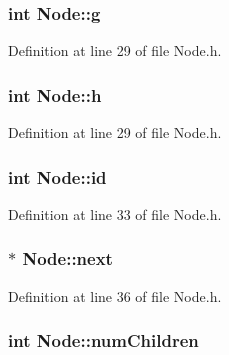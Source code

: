 \hypertarget{class_node_a0b249888eacdec6c623ec8c58b230c48}{
\subsubsection[{g}]{\setlength{\rightskip}{0pt plus 5cm}int {\bf Node::g}}}
\label{class_node_a0b249888eacdec6c623ec8c58b230c48}


Definition at line 29 of file Node.h.

\hypertarget{class_node_afb5a7ac7536a9e09488bb685420cd78a}{
\subsubsection[{h}]{\setlength{\rightskip}{0pt plus 5cm}int {\bf Node::h}}}
\label{class_node_afb5a7ac7536a9e09488bb685420cd78a}


Definition at line 29 of file Node.h.

\hypertarget{class_node_a59a543130a10c95f1e8642cf8c5645e8}{
\subsubsection[{id}]{\setlength{\rightskip}{0pt plus 5cm}int {\bf Node::id}}}
\label{class_node_a59a543130a10c95f1e8642cf8c5645e8}


Definition at line 33 of file Node.h.

\hypertarget{class_node_a2559a716f69ccaa76d648d9f1b83065e}{
\subsubsection[{next}]{$\ast$ {\bf Node::next}}}
\label{class_node_a2559a716f69ccaa76d648d9f1b83065e}


Definition at line 36 of file Node.h.

\hypertarget{class_node_a5037540b2e3d6349d66ea25b062b6aa8}{
\subsubsection[{numChildren}]{\setlength{\rightskip}{0pt plus 5cm}int {\bf Node::numChildren}}}
\label{class_node_a5037540b2e3d6349d66ea25b062b6aa8}


